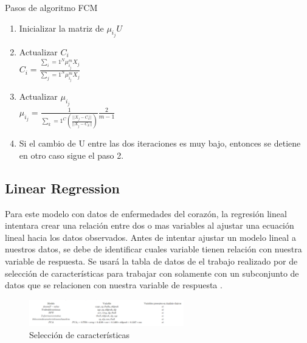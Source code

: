 \documentclass[10pt,journal]{IEEEtran}
\begin{document}
Pasos de algoritmo FCM
\begin{enumerate}
  \item Inicializar la matriz de \begin{math}\mu_{i_j} U\end{math} \\
  \item Actualizar \begin{math} C_i \end{math} \\
        \begin{math}C_i = \frac{\sum_i=1^N  \mu_{i_j}^m X_j} { \sum_j=1^N  \mu_{i_j}^m X_j} \end{math}
  
  \item Actualizar \begin{math}\mu_{i_j} \end{math} \\
         \begin{math}\mu_{i_j} = \frac{1} {\sum_k=1^C ( \frac{\vert \vert X_j - C_i \vert\vert }{\vert \vert X_j - C_k \vert\vert} )} \frac{2}{m-1}\end{math} \\
  \item Si el cambio de U entre las dos iteraciones es muy bajo, entonces se detiene en otro caso sigue el paso 2.       
         
\end{enumerate}

\subsection{Linear Regression}

Para este modelo con datos de enfermedades del corazón, la regresión lineal intentara crear una relación entre dos o mas variables al ajustar una ecuación lineal hacia los datos observados. 
Antes de intentar ajustar un modelo lineal a nuestros datos, se debe de identificar cuales variable tienen relación con nuestra variable de respuesta.
Se usará la tabla de datos de el trabajo realizado \cite{emmanuelramosFeatureSelection} por de selección de características para trabajar con solamente con un subconjunto de datos que se relacionen con nuestra variable de respuesta .

\begin{figure}[ht]
    \centering
    \includegraphics[width=0.60\textwidth]{feature_selection_cap4.png}
    \caption{Selección de características} 
    \label{fig:feature_selec}
\end{figure}
\end{document}
